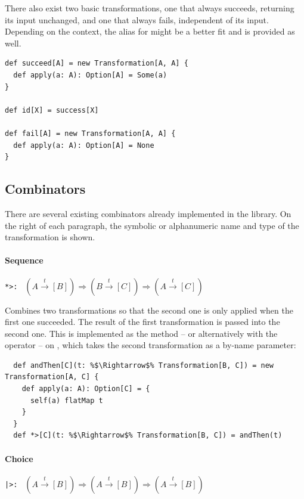 \documentclass[10pt,a4paper,oneside]{scrreprt}
\begin{document}
There also exist two basic transformations, one that always succeeds, returning its input unchanged, and one that always fails, independent of its input. Depending on the context, the alias  for  might be a better fit and is provided as well.

\begin{lstlisting}
def succeed[A] = new Transformation[A, A] {
  def apply(a: A): Option[A] = Some(a)
}

def id[X] = success[X]

def fail[A] = new Transformation[A, A] {
  def apply(a: A): Option[A] = None
}
\end{lstlisting}

\subsection{Combinators}

There are several existing combinators already implemented in the library. On the right of each paragraph, the symbolic or alphanumeric name and type of the transformation is shown.

\paragraph{Sequence} \hfill \lstinline{*>: } $(A \overset{t}{\rightarrow} [B]) \Rightarrow (B \overset{t}{\rightarrow} [C]) \Rightarrow (A \overset{t}{\rightarrow} [C])$

\vspace{7pt} Combines two transformations so that the second one is only applied when the first one succeeded. The result of the first transformation is passed into the second one. This is implemented as the  method -- or alternatively with the \src{*>} operator -- on , which takes the second transformation as a by-name parameter:

\begin{lstlisting}
  def andThen[C](t: %$\Rightarrow$% Transformation[B, C]) = new Transformation[A, C] {
    def apply(a: A): Option[C] = {
      self(a) flatMap t
    }
  }
  def *>[C](t: %$\Rightarrow$% Transformation[B, C]) = andThen(t)
\end{lstlisting}


\paragraph{Choice} \hfill \lstinline{|>: } $(A \overset{t}{\rightarrow} [B]) \Rightarrow (A \overset{t}{\rightarrow} [B]) \Rightarrow (A \overset{t}{\rightarrow} [B])$
\end{document}

